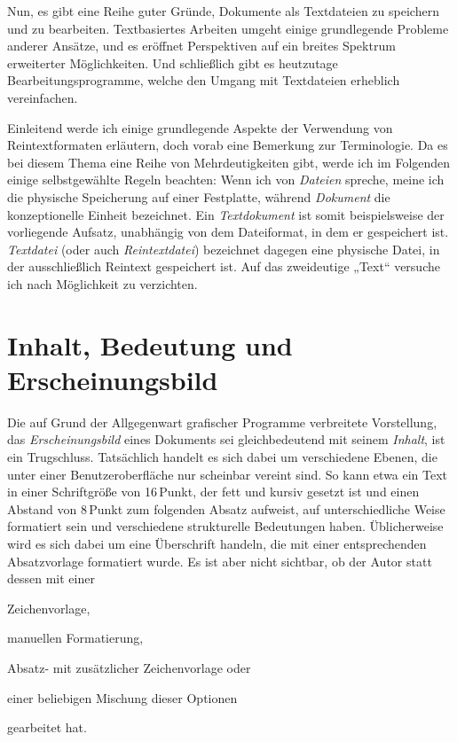 \documentclass[DIV=12]{scrreprt}
\begin{document}
Nun, es gibt eine Reihe guter Gründe, Dokumente als Textdateien zu speichern und zu bearbeiten.
Textbasiertes Arbeiten umgeht einige grundlegende Probleme anderer Ansätze, und es eröffnet Perspektiven auf ein breites Spektrum erweiterter Möglichkeiten.
Und schließlich gibt es heutzutage Bearbeitungsprogramme, welche den Umgang mit Textdateien erheblich vereinfachen.

Einleitend werde ich einige grundlegende Aspekte der Verwendung von Reintextformaten erläutern, doch vorab eine Bemerkung zur Terminologie.
Da es bei diesem Thema eine Reihe von Mehrdeutigkeiten gibt, werde ich im Folgenden einige selbstgewählte Regeln beachten:
Wenn ich von \emph{Dateien} spreche, meine ich die physische Speicherung auf einer Festplatte, während \emph{Dokument} die konzeptionelle Einheit bezeichnet.
Ein \emph{Textdokument} ist somit beispielsweise der vorliegende Aufsatz, unabhängig von dem Dateiformat, in dem er gespeichert ist.
\emph{Textdatei} (oder auch \emph{Reintextdatei}) bezeichnet dagegen eine physische Datei, in der ausschließlich Reintext gespeichert ist.
Auf das zweideutige „Text“ versuche ich nach Möglichkeit zu verzichten.

\section{Inhalt, Bedeutung und Erscheinungsbild}
\label{sec:pt_separation-content-meaning-appearance}
Die auf Grund der Allgegenwart grafischer Programme verbreitete Vorstellung, das \emph{Erscheinungsbild} eines Dokuments sei gleichbedeutend mit seinem \emph{Inhalt}, ist ein Trugschluss.
Tatsächlich handelt es sich dabei um verschiedene Ebenen, die unter einer Benutzeroberfläche nur scheinbar vereint sind.
So kann etwa ein Text in einer Schriftgröße von 16\,Punkt, der fett und kursiv gesetzt ist und einen Abstand von 8\,Punkt zum folgenden Absatz aufweist, auf unterschiedliche Weise formatiert sein und verschiedene strukturelle Bedeutungen haben.
Üblicherweise wird es sich dabei um eine Überschrift handeln, die mit einer entsprechenden Absatzvorlage formatiert wurde.
Es ist aber nicht sichtbar, ob der Autor statt dessen mit einer
\begin{inparaenum}[1)]
\item Zeichenvorlage,
\item manuellen Formatierung,
\item Absatz- mit zusätzlicher Zeichenvorlage oder
\item einer beliebigen Mischung dieser Optionen
\end{inparaenum}
gearbeitet hat.
\end{document}
